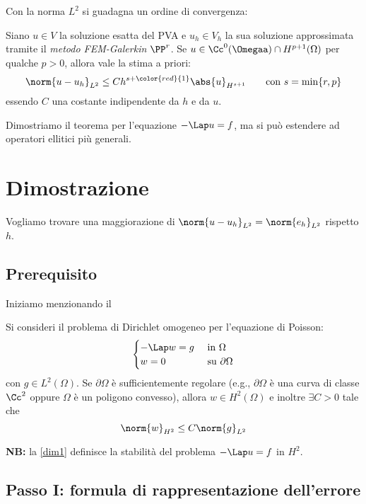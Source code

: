 Con la norma $L^2$ si guadagna un ordine di convergenza:
\begin{thm}
Siano $u\in V$ la soluzione esatta del PVA e $u_h\in V_h$ la sua soluzione approssimata tramite il \emph{metodo FEM-Galerkin} $\PP^r$. Se $u\in\Cc^0(\Omegaa)\cap H^{p+1}(\Omega)$ per qualche $p>0$, allora vale la stima a priori:
\begin{equation}\label{stima3}
\norm{u-u_h}_{L^2}\leq Ch^{s+\color{red}{1}}\abs{u}_{H^{s+1}}\qquad \text{con } s=\min\{r,p\}
\end{equation}
essendo $C$ una costante indipendente da $h$ e da $u$.
\end{thm}

Dimostriamo il teorema per l'equazione $-\Lap u=f$, ma si può estendere ad operatori ellitici più generali.

\section{Dimostrazione}

Vogliamo trovare una maggiorazione di $\norm{u-u_h}_{L^2}=\norm{e_h}_{L^2}$ rispetto $h$.

\subsection*{Prerequisito}

Iniziamo menzionando il
\begin{lemma}
Si consideri il problema di Dirichlet omogeneo per l'equazione di Poisson:
\begin{equation*}
\begin{cases}
-\Lap w=g &\text{ in }\Omega \\
w=0 &\text{ su }\partial\Omega
\end{cases}
\end{equation*}
con $g\in L^2(\Omega)$. Se $\partial\Omega$ è sufficientemente regolare (e.g., $\partial\Omega$ è una curva di classe $\Cc^2$ oppure $\Omega$ è un poligono convesso), allora $w\in H^2(\Omega)$ e inoltre $\exists C>0$ tale che
\begin{equation}\label{dim1}
\norm{w}_{H^2}\leq C\norm{g}_{L^2}
\end{equation}
\end{lemma}

\textbf{NB:} la \eqref{dim1} definisce la stabilità del problema $-\Lap u=f$ in $H^2$.

\subsection*{Passo I: formula di rappresentazione dell'errore}

